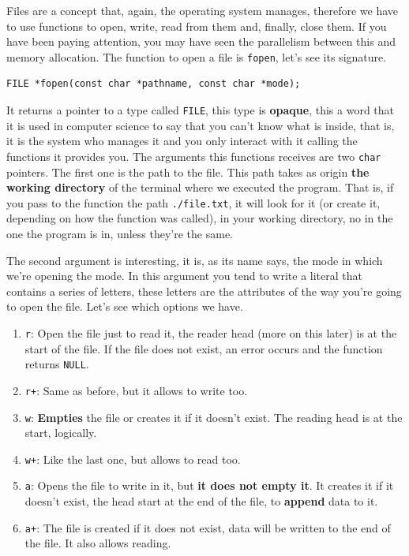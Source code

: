 \documentclass[a4paper]{article}
\begin{document}
Files are a concept that, again, the operating system manages, therefore we have
to use functions to open, write, read from them and, finally, close them. If you
have been paying attention, you may have seen the parallelism between this and
memory allocation. The function to open a file is \lstinline[style=C]!fopen!,
let's see its signature.

\noindent
\begin{minipage}[H]{\linewidth}
\mbox{}
\begin{lstlisting}[style=C,
caption={\texttt{fopen} function declaration},
label={lst:callocSignature}]
FILE *fopen(const char *pathname, const char *mode);
\end{lstlisting}
\end{minipage}

It returns a pointer to a type called \verb!FILE!, this type is \textbf{opaque},
this a word that it is used in computer science to say that you can't know what
is inside, that is, it is the system who manages it and you only interact with
it calling the functions it provides you. The arguments this functions receives
are two \texttt{char} pointers. The first one is the path to the file. This path
takes as origin \textbf{the working directory} of the terminal where we
executed the program. That is, if you pass to the function the path
\verb!./file.txt!, it will look for it (or create it, depending on how the
function was called), in your working directory, no in the one the program is
in, unless they're the same.

The second argument is interesting, it is, as its name says, the mode in which
we're opening the mode. In this argument you tend to write a literal that
contains a series of letters, these letters are the attributes of the way you're
going to open the file. Let's see which options we have.
\begin{enumerate}
\item \verb!r!: Open the file just to read it, the reader head (more on this
later) is at the
start of the file. If the file does not exist, an error occurs and the
function returns \verb!NULL!.
\item \verb!r+!: Same as before, but it allows to write too.
\item \verb!w!: \textbf{Empties} the file or creates it if it doesn't exist.
The reading head is at the start, logically.
\item \verb!w+!: Like the last one, but allows to read too.
\item \verb!a!: Opens the file to write in it, but \textbf{it does not empty
it}. It creates it if it doesn't exist, the head start at the end of the
file, to \textbf{append} data to it.
\item \verb!a+!: The file is created if it does not exist, data will be
written to the end of the file. It also allows reading.
\end{enumerate}
\end{document}
